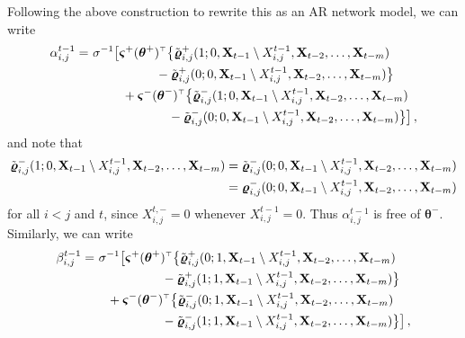 \documentclass[12pt]{article}
\newcommand{\bvarsigma}{\boldsymbol \varsigma}
\newcommand{\bvarrho}{\boldsymbol \varrho}
\newcommand{\btheta}{\boldsymbol \theta}
\def\T{{\scriptscriptstyle \top} }
\newcommand{\0}{{\bf 0}}
\begin{document}
Following the above construction to rewrite this as an AR network model, we can write
\begin{align*}
    \alpha_{i,j}^{t-1} %
  =&~ \sigma^{-1} \big[ \bvarsigma^+(\btheta^+)^{\T} \big\{ \tilde{\bvarrho}^+_{i,j}(1 ; 0 , {\bf X}_{t-1} \setminus X_{i,j}^{t-1}, {\bf X}_{t-2}, \ldots, {\bf X}_{t-m}) \\
  &~~~~~~~~~~~~~~~~- \tilde{\bvarrho}^+_{i,j}(0 ; 0 , {\bf X}_{t-1} \setminus X_{i,j}^{t-1}, {\bf X}_{t-2}, \ldots, {\bf X}_{t-m} )\big\} \\
  &~~~~~~~~+\bvarsigma^-(\btheta^-)^{\T} \big\{ \tilde{\bvarrho}^-_{i,j}(1 ; 0 , {\bf X}_{t-1} \setminus X_{i,j}^{t-1}, {\bf X}_{t-2}, \ldots, {\bf X}_{t-m}) \\
  &~~~~~~~~~~~~~~~~~~~- \tilde{\bvarrho}^-_{i,j}(0 ; 0 , {\bf X}_{t-1} \setminus X_{i,j}^{t-1}, {\bf X}_{t-2}, \ldots, {\bf X}_{t-m} )\big\} \big]\,,
\end{align*} 
and note that 
\begin{align*}
    \tilde{\bvarrho}^-_{i,j}(1 ; 0 , {\bf X}_{t-1} \setminus X_{i,j}^{t-1}, {\bf X}_{t-2}, \ldots, {\bf X}_{t-m}) &= \tilde{\bvarrho}^-_{i,j}(0 ; 0 , {\bf X}_{t-1} \setminus X_{i,j}^{t-1}, {\bf X}_{t-2}, \ldots, {\bf X}_{t-m} ) \\
    &= \bvarrho^-_{i,j}(0 ; 0 , {\bf X}_{t-1} \setminus X_{i,j}^{t-1}, {\bf X}_{t-2}, \ldots, {\bf X}_{t-m} )
\end{align*}
for all $i < j$ and $t$, since $X_{i,j}^{t,-}=0$ whenever $X_{i,j}^{t-1}=0$.
Thus $\alpha_{i,j}^{t-1}$ is free of $\btheta^-$. Similarly,
we can write 
\begin{align*}
    \beta_{i,j}^{t-1} %
  =&~ \sigma^{-1} \big[ \bvarsigma^+(\btheta^+)^{\T} \big\{ \tilde{\bvarrho}^+_{i,j}(0 ; 1 , {\bf X}_{t-1} \setminus X_{i,j}^{t-1}, {\bf X}_{t-2}, \ldots, {\bf X}_{t-m}) \\
  &~~~~~~~~~~~~~~~~- \tilde{\bvarrho}^+_{i,j}(1 ; 1 , {\bf X}_{t-1} \setminus X_{i,j}^{t-1}, {\bf X}_{t-2}, \ldots, {\bf X}_{t-m} )\big\} \\
  &~~~+\bvarsigma^-(\btheta^-)^{\T} \big\{ \tilde{\bvarrho}^-_{i,j}(0 ; 1 , {\bf X}_{t-1} \setminus X_{i,j}^{t-1}, {\bf X}_{t-2}, \ldots, {\bf X}_{t-m}) \\
  &~~~~~~~~~~~~~~~~- \tilde{\bvarrho}^-_{i,j}(1 ; 1 , {\bf X}_{t-1} \setminus X_{i,j}^{t-1}, {\bf X}_{t-2}, \ldots, {\bf X}_{t-m} )\big\} \big]\,,
\end{align*} 
\end{document}
